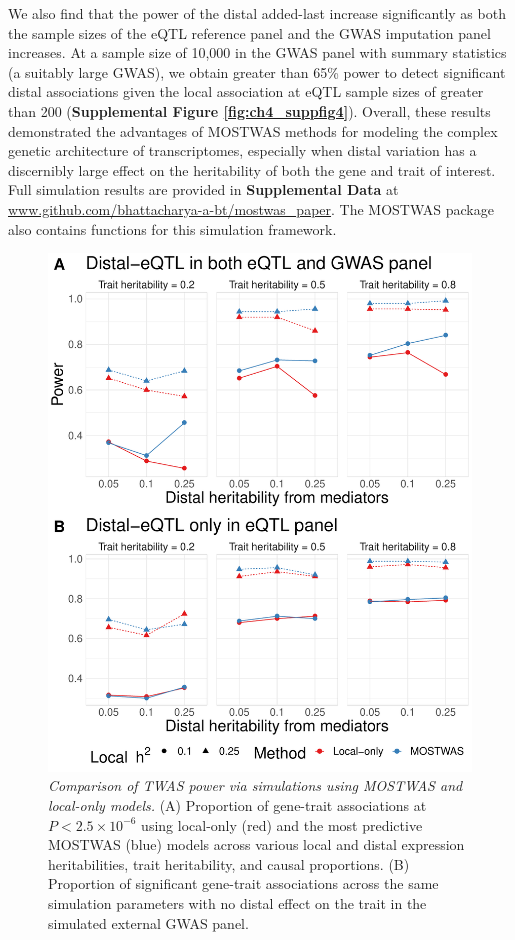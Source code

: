  We also find that the power of
 the distal added-last increase significantly
 as both the sample sizes of the eQTL
 reference panel and the GWAS imputation
 panel increases. At
 a sample size of 10,000 in the GWAS panel 
 with summary statistics (a suitably
 large GWAS), we obtain
 greater than 65\% power to
 detect significant distal associations
 given the local association at
 eQTL sample sizes of greater than 200
 (\textbf{Supplemental Figure \ref{fig:ch4_suppfig4}}).
 Overall, these results demonstrated 
 the advantages of MOSTWAS methods for 
 modeling the complex genetic 
 architecture of transcriptomes, 
 especially when distal variation has a discernibly
 large effect on the heritability of both the gene 
 and trait of interest.
 Full simulation results are provided
 in \textbf{Supplemental Data} at
 \url{www.github.com/bhattacharya-a-bt/mostwas_paper}. The MOSTWAS
 package also contains functions
 for this simulation framework.

\begin{figure}[htbp]
\centering
	\includegraphics[width = .7\textwidth]{figures/ch4_fig3.pdf}
	\caption{\emph{Comparison of
	TWAS power via simulations
	using MOSTWAS and local-only models.} (A)
	Proportion of gene-trait associations
	at $P < 2.5 \times 10^{-6}$ using local-only (red)
	and the most predictive MOSTWAS (blue) models
	across various local and distal expression heritabilities,
	trait heritability, and causal proportions. (B)
	Proportion of significant gene-trait associations
	across the same simulation parameters with
	no distal effect on the trait in the simulated 
	external GWAS panel.}
	\label{fig:ch4_fig3}
\end{figure}

